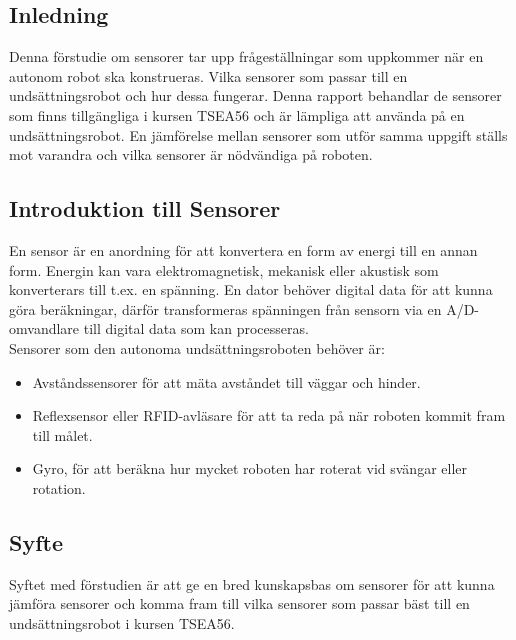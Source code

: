 \documentclass[11pt]{article}
\begin{document}
\pagebreak


\begin{flushleft}


\section{Inledning}
Denna förstudie om sensorer tar upp frågeställningar som uppkommer när en autonom robot ska konstrueras. Vilka sensorer som passar till en undsättningsrobot och hur dessa fungerar. Denna rapport behandlar de sensorer som finns tillgängliga i kursen TSEA56 och är lämpliga att använda på en undsättningsrobot. En jämförelse mellan sensorer som utför samma uppgift ställs mot varandra och vilka sensorer är nödvändiga på roboten. 
 
\subsection{Introduktion till Sensorer}
En sensor är en anordning för att konvertera en form av energi till en annan form. Energin kan vara elektromagnetisk, mekanisk eller akustisk som konverterars till t.ex. en spänning. En dator behöver digital data för att kunna göra beräkningar, därför transformeras spänningen från sensorn via en A/D-omvandlare till digital data som kan processeras. 
\\[0.1in]
Sensorer som den autonoma undsättningsroboten behöver är:
\begin{itemize}
\item Avståndssensorer för att mäta avståndet till väggar och hinder.

\item Reflexsensor eller RFID-avläsare för att ta reda på när roboten kommit fram till målet.

\item Gyro, för att beräkna hur mycket roboten har roterat vid svängar eller rotation.

\end{itemize}

\subsection{Syfte}

Syftet med förstudien är att ge en bred kunskapsbas om sensorer för att kunna jämföra sensorer och komma fram till vilka sensorer som passar bäst till en undsättningsrobot i kursen TSEA56.


\end{flushleft}
\end{document}
